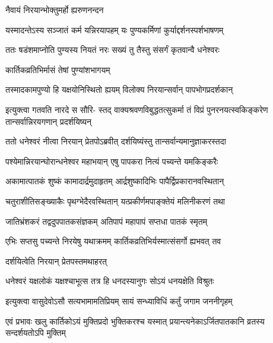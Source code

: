 
\onelineshloka
{नैवायं निरयान्भोक्तुमर्हो ह्यरुणनन्दन} %

\twolineshloka
{यस्मादन्तेऽस्य सञ्जातं कर्म यन्निरयापहम्}
{यः पुण्यकर्मिणां कुर्याद्दर्शनस्पर्शभाषणम्} %

\twolineshloka
{ततः षडंशमाप्नोति पुण्यस्य नियतं नरः}
{सख्यं तु तैस्तु संसर्गं कृतवान्वै धनेश्वरः} %


\onelineshloka
{कार्तिकव्रतिभिर्मासं तेषां पुण्यांशभागयम्} %

\twolineshloka
{तस्मादकामपुण्यो हि यक्षयोनिस्थितो ह्ययम्}
{विलोक्य निरयान्सर्वान् पापभोगप्रदर्शकान्} %


\fourlineindentedshloka
{इत्युक्त्वा गतवति नारदे स सौरि-}
{स्तद् वाक्यश्रवणविबुद्धतत्सुकर्मा}
{तं विप्रं पुनरनयत्स्वकिङ्करेण}
{तान्सर्वान्निरयगणान् प्रदर्शयिष्यन्} %


\twolineshloka
{ततो धनेश्वरं नीत्वा निरयान् प्रेतपोऽब्रवीत्}
{दर्शयिष्यंस्तु तान्सर्वान्यमानुज्ञाकरस्तदा} %


\twolineshloka
{पश्येमान्निरयान्घोरान्धनेश्वर महाभयान्}
{एषु पापकरा नित्यं पच्यन्ते यमकिङ्करैः} %

\twolineshloka
{अकामात्पातकं शुष्कं कामादार्द्रमुदाहृतम्}
{आर्द्रशुष्कादिभिः पापैर्द्विप्रकारानवस्थितान्} %

\twolineshloka
{चतुराशीतिसङ्ख्याकैः पृथग्भेदैरवस्थितान्}
{यत्प्रकीर्णमपाङ्क्तेयं मलिनीकरणं तथा} %

\twolineshloka
{जातिभ्रंशकरं तद्वदुपपातकसंज्ञकम्}
{अतिपापं महापापं सप्तधा पातकं स्मृतम्} %

\twolineshloka
{एभिः सप्तसु पच्यन्ते निरयेषु यथाक्रमम्}
{कार्तिकव्रतिभिर्यस्मात्संसर्गो ह्यभवत् तव} %




\onelineshloka
{दर्शयित्वेति निरयान् प्रेतपस्तमथाहरत्} %

\twolineshloka
{धनेश्वरं यक्षलोकं यक्षश्चाभूत्स तत्र हि}
{धनदस्यानुगः सोऽयं धनयक्षेति विश्रुतः} %


\twolineshloka
{इत्युक्त्वा वासुदेवोऽसौ सत्यभामामतिप्रियम्}
{सायं सन्ध्याविधिं कर्तुं जगाम जननीगृहम्} %



\fourlineindentedshloka
{एवं प्रभावः खलु कार्तिकोऽयं}
{मुक्तिप्रदो भुक्तिकरश्च यस्मात्}
{प्रयान्त्यनेकाऽर्जितपातकानि}
{व्रतस्य सन्दर्शयतोऽपि मुक्तिम्} %


